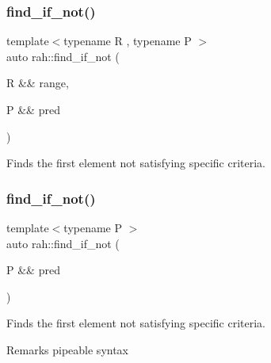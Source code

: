 \subsubsection{\texorpdfstring{find\_if\_not()}{find\_if\_not()}\hspace{0.1cm}{\footnotesize\ttfamily [1/2]}}
{\footnotesize\ttfamily template$<$typename R , typename P $>$ \\
auto rah\+::find\+\_\+if\+\_\+not (\begin{DoxyParamCaption}\item[{R \&\&}]{range,  }\item[{P \&\&}]{pred }\end{DoxyParamCaption})}



Finds the first element not satisfying specific criteria. 


\begin{DoxyCodeInclude}{0}
\DoxyCodeLine{        );}
\end{DoxyCodeInclude}
\mbox{\label{namespacerah_a406c37a2cf758e7329bfd696a6bf8f89}} 
\subsubsection{\texorpdfstring{find\_if\_not()}{find\_if\_not()}\hspace{0.1cm}{\footnotesize\ttfamily [2/2]}}
{\footnotesize\ttfamily template$<$typename P $>$ \\
auto rah\+::find\+\_\+if\+\_\+not (\begin{DoxyParamCaption}\item[{P \&\&}]{pred }\end{DoxyParamCaption})}



Finds the first element not satisfying specific criteria. 

\begin{DoxyRemark}{Remarks}
pipeable syntax
\end{DoxyRemark}


